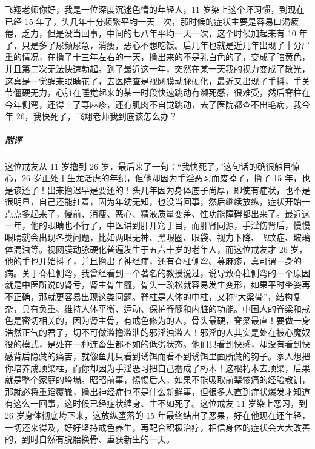 \begin{case}
    飞翔老师你好，我是一位深度沉迷色情的年轻人，11 岁染上这个坏习惯，到现在已经 15 年了，头几年十分频繁平均一天三次，那时候的症状主要是容易口渴疲倦，乏力，但是没当回事，中间的七八年平均一天一次，这个时候加起来有 10 年了，只是多了尿频尿急，消瘦，恶心不想吃饭。后几年也就是近几年出现了十分严重的情况，在撸了十三年左右的一天，撸出来的不是乳白色的了，变成了暗黄色，并且第二次无法快速勃起。到了最近这一年，突然在某一天我的视力变成了散光，这真是一觉醒来眼睛花了，去医院查是视网膜动脉硬化，最近又出现了手抖，手关节僵硬无力，心脏在睡觉起来的某一时段快速跳动有濒死感，很难受，然后脊柱在今年侧弯，还得上了荨麻疹，还有肌肉不自觉跳动，去了医院都查不出毛病，我今年 26，我快死了，飞翔老师我到底该怎么办？
    \subparagraph{附评} 这位戒友从 11 岁撸到 26 岁，最后来了一句：“我快死了。”这句话的确很触目惊心，26 岁正处于生龙活虎的年纪，但他却因为手淫恶习而废掉了，撸了 15 年，也是该还了！出来撸迟早是要还的！头几年因为身体底子尚厚，即使有症状，也不是很明显，自己还能扛着，因为年幼无知，也没当回事，然后继续放纵，症状开始一点点多起来了，慢前、消瘦、恶心、精液质量变差、性功能障碍都出来了。最近这一年，他的眼睛也不行了，中医讲到肝开窍于目，而肝肾同源，手淫伤肾后，慢慢眼睛就会出现各类问题，比如两眼无神、黑眼圈、眼袋、视力下降、飞蚊症、玻璃体混浊等。视网膜动脉硬化普遍发生于五六十岁的老年人，而这位戒友才 26 岁，他的手也开始抖了，并且撸出了神经症，还有脊柱侧弯、荨麻疹，真可谓一身的病。关于脊柱侧弯，我曾经看到一个著名的教授说过，说导致脊柱侧弯的一个原因就是中医所说的肾亏，肾主骨生髓，骨头一疏松就容易发生变形，如果平时坐姿再不正确，那就更容易出现这类问题。脊柱是人体的中柱，又称“大梁骨”，结构复杂，具有负重、维持人体平衡、运动、保护脊髓和内脏的功能。中国人的脊梁和戒色是密切相关的，因为肾主骨，有戒色修为的人，骨头最硬，脊梁最直！要做一身浩然正气的君子，切不可做滥撸滥泄的邪淫浊滥人！邪淫的人其实是处在被心魔奴役的模式，是处在一种连畜生都不如的低劣状态。他们只看到快感，却没有看到快感背后隐藏的痛苦，就像鱼儿只看到诱饵而看不到诱饵里面所藏的钩子。家人想把你培养成顶梁柱，而你却因为手淫恶习把自己撸成了朽木！这根朽木去顶梁，后果就是整个家庭的垮塌。昭昭前事，惕惕后人，如果不能吸取前辈惨痛的经验教训，那就必将重蹈覆辙，撸出神经症也不是什么新鲜事，但很多人直到症状爆发才知道有这么一回事，这时候已经症状缠身、生不如死了。这位戒友 11 岁染上恶习，到 26 岁身体彻底垮下来，这放纵堕落的 15 年最终结出了恶果，好在他现在还年轻，一切还来得及，好好坚持戒色养生，再配合积极治疗，相信身体的症状会大大改善的，到时自然有脱胎换骨、重获新生的一天。
\end{case}

